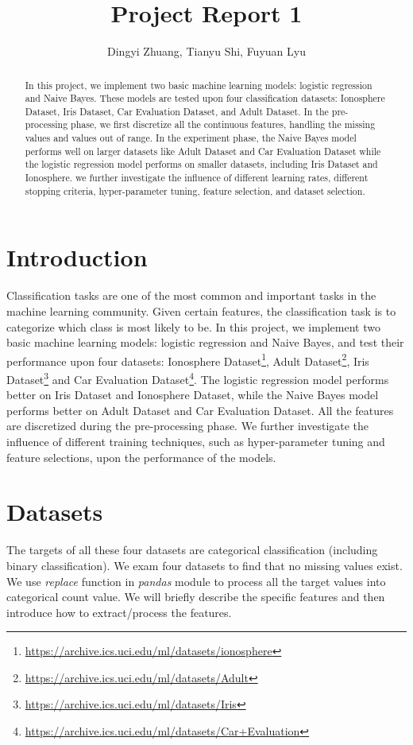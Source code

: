 \documentclass[11pt]{scrartcl}
\title{Project Report 1}
\author{Dingyi Zhuang, Tianyu Shi, Fuyuan Lyu}
\begin{document}
\maketitle

\begin{abstract}
In this project, we implement two basic machine learning models: logistic regression and Naive Bayes. These models are tested upon four classification datasets: Ionosphere Dataset, Iris Dataset, Car Evaluation Dataset, and Adult Dataset. In the pre-processing phase, we first discretize all the continuous features, handling the missing values and values out of range. In the experiment phase, the Naive Bayes model performs well on larger datasets like Adult Dataset and Car Evaluation Dataset while the logistic regression model performs on smaller datasets, including Iris Dataset and Ionosphere. we further investigate the influence of different learning rates, different stopping criteria, hyper-parameter tuning, feature selection, and dataset selection.

\end{abstract}

\section{Introduction}
Classification tasks are one of the most common and important tasks in the machine learning community. Given certain features, the classification task is to categorize which class is most likely to be. In this project, we implement two basic machine learning models: logistic regression and Naive Bayes, and test their performance upon four datasets: Ionosphere Dataset\footnote{\url{https://archive.ics.uci.edu/ml/datasets/ionosphere}}, Adult Dataset\footnote{\url{https://archive.ics.uci.edu/ml/datasets/Adult}}, Iris Dataset\footnote{\url{https://archive.ics.uci.edu/ml/datasets/Iris}} and Car Evaluation Dataset\footnote{\url{https://archive.ics.uci.edu/ml/datasets/Car+Evaluation}}. The logistic regression model performs better on Iris Dataset and Ionosphere Dataset, while the Naive Bayes model performs better on Adult Dataset and Car Evaluation Dataset. All the features are discretized during the pre-processing phase. We further investigate the influence of different training techniques, such as hyper-parameter tuning and feature selections, upon the performance of the models.


\section{Datasets}
The targets of all these four datasets are categorical classification (including binary classification). We exam four datasets to find that no missing values exist. We use \textit{replace} function in \textit{pandas} module to process all the target values into categorical count value. We will briefly describe the specific features and then introduce how to extract/process the features.
\end{document}
